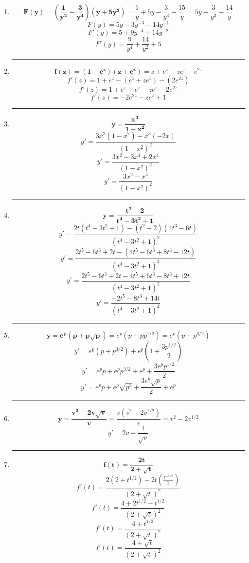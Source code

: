 \documentclass[12pt]{article}
\begin{document}
\begin{enumerate}[label=\textbf{\arabic*)}]
            \hrule\item \[\bm{F(y) = \left(\frac{1}{y^2} - \frac{3}{y^4}\right)(y + 5y^3)} = \frac{1}{y} + 5y - \frac{3}{y^3} - \frac{15}{y} = 5y - \frac{3}{y^3} - \frac{14}{y}\]
                \[F(y) = 5y - 3y^{-3} - 14y^{-1}\]
                \[F'(y) = 5 + 9y^{-4} + 14y^{-2}\]
                \[F'(y) = \frac{9}{y^4} + \frac{14}{y^2} + 5\]

            \hrule\item \[\bm{f(z) = (1 - e^z)(z + e^z)} = z + e^z - ze^z - e^{2z}\]
                \[f'(z) = 1 + e^z - (e^z + ze^z) - (2e^{2z})\]
                \[f'(z) = 1 + e^z - e^z - ze^z -2e^{2z}\]
                \[f'(z) = -2e^{2z} - ze^z + 1\]

            \hrule\item \[\bm{y = \frac{x^3}{1 - x^2}}\]
                \[y' = \frac{3x^2 (1 - x^2) - x^3(- 2x)}{(1 - x^2)^2}\]
                \[y' = \frac{3x^2 - 3x^4 + 2x^4}{(1 - x^2)^2}\]
                \[y' = \frac{3x^2 - x^4}{(1 - x^2)^2}\]


            \hrule\item \[\bm{y = \frac{t^2 + 2}{t^4 - 3t^2 + 1}}\]
                \[y' = \frac{2t(t^4 - 3t^2 + 1) - (t^2 + 2)(4t^3 - 6t)}{(t^4 - 3t^2 + 1)^2}\]
                \[y' = \frac{2t^5 - 6t^3 + 2t - (4t^5 - 6t^3 + 8t^3 - 12t)}{(t^4 - 3t^2 + 1)^2}\]
                \[y' = \frac{2t^5 - 6t^3 + 2t - 4t^5 + 6t^3 - 8t^3 + 12t}{(t^4 - 3t^2 + 1)^2}\]
                \[y' = \frac{-2t^5 - 8t^3 + 14t}{(t^4 - 3t^2 + 1)^2}\]

            \hrule\item \[\bm{y = e^p(p + p \sqrt{p})} = e^p(p + pp^{1/2}) = e^p(p + p^{3/2})\]
                \[y' = e^p(p + p^{3/2}) + e^p\left(1 + \frac{3p^{1/2}}{2}\right)\]
                \[y' = e^p p + e^p p^{3/2} + e^p + \frac{3e^p p^{1/2}}{2}\]
                \[y' = e^p p + e^p \sqrt{p^3} + \frac{3e^p \sqrt{p}}{2} + e^p\]


            \hrule\item \[\bm{y = \frac{v^3 - 2v \sqrt{v}}{v}} = \frac{v(v^2 - 2v^{1/2})}{v} = v^2 - 2v^{1/2}\]
                \[y' = 2v - \frac{1}{\sqrt{v}}\]

            \hrule\item \[\bm{f(t) = \frac{2t}{2 + \sqrt{t}}}\]
                \[f'(t) = \frac{2(2 + t^{1/2}) - 2t(\frac{t^{-1/2}}{2})}{(2 + \sqrt{t})^2}\]
                \[f'(t) = \frac{4 + 2t^{1/2} - t^{1/2}}{(2 + \sqrt{t})^2}\]
                \[f'(t) = \frac{4 + t^{1/2}}{(2 + \sqrt{t})^2}\]
                \[f'(t) = \frac{4 + \sqrt{t}}{(2 + \sqrt{t})^2}\]


\end{enumerate}
\end{document}
